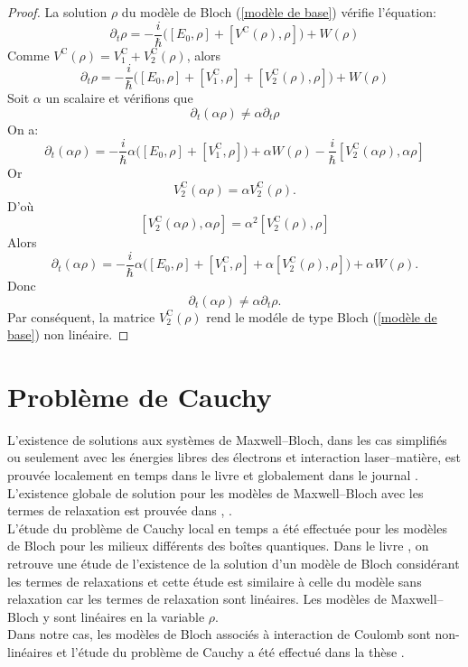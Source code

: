 \documentclass[12pt,a4paper,openany,oneside]{book}
\begin{document}
{{{{{{  \begin{proof}
  La solution $ \rho $ du modèle de Bloch (\ref{modèle de base}) vérifie l'équation:
$$ \partial_{t}\rho  = -\dfrac{i}{\hbar}\Big([E_{0},\rho]+[V^{\textrm{C}}(\rho),\rho]\Big)+ W(\rho) $$
Comme $ V^{\textrm{C}}(\rho)= V_{1}^{\textrm{C}}+ V_{2}^{\textrm{C}}(\rho) $, alors 
$$ \partial_{t}\rho  = -\dfrac{i}{\hbar}\Big([E_{0},\rho]+[V_{1}^{\textrm{C}},\rho]+[V_{2}^{\textrm{C}}(\rho),\rho]\Big)+ W(\rho) $$
Soit $ \alpha $ un scalaire et vérifions que 
$$ \partial_{t}(\alpha\rho) \neq \alpha\partial_{t}\rho $$
On a:
$$ \partial_{t}(\alpha\rho) = -\dfrac{i}{\hbar}\alpha\Big([E_{0},\rho]+[V_{1}^{\textrm{C}},\rho]\Big)+ \alpha W(\rho)-\dfrac{i}{\hbar}[V_{2}^{\textrm{C}}(\alpha\rho),\alpha\rho] $$
Or $$ V_{2}^{\textrm{C}}(\alpha\rho)= \alpha V_{2}^{\textrm{C}}(\rho).$$
D'où
$$ [V_{2}^{\textrm{C}}(\alpha\rho),\alpha\rho] = \alpha^{2}[V_{2}^{\textrm{C}}(\rho),\rho] $$
Alors
$$ \partial_{t}(\alpha\rho) = -\dfrac{i}{\hbar}\alpha\Big([E_{0},\rho]+[V_{1}^{\textrm{C}},\rho] + \alpha[V_{2}^{\textrm{C}}(\rho),\rho]\Big)+ \alpha W(\rho) .$$
Donc 
$$ \partial_{t}(\alpha\rho) \neq \alpha\partial_{t}\rho .$$
Par conséquent, la matrice $ V_{2}^{\textrm{C}}(\rho) $ rend le modéle de type Bloch (\ref{modèle de base}) non linéaire.

  \end{proof}
  
\section{Problème de Cauchy}  

L’existence de solutions aux systèmes de Maxwell–Bloch, dans les cas simplifiés ou seulement avec les énergies libres des électrons et interaction laser–matière, est prouvée localement en temps dans le livre \cite{mareference11} et globalement dans le journal \cite{mareference12}. L’existence globale de solution pour les modèles de Maxwell–Bloch avec les termes de relaxation est prouvée dans \cite{mareference13}, \cite{mareference14}.\\
L’étude du problème de Cauchy local en temps a été effectuée pour les modèles de Bloch pour les milieux différents des boîtes quantiques. Dans le livre \cite{mareference11}, on retrouve une étude de l’existence de la solution d’un modèle de Bloch considérant les termes de relaxations et cette étude est
similaire à celle du modèle sans relaxation car les termes de relaxation sont linéaires. Les
modèles de Maxwell–Bloch y sont linéaires en la variable $\rho $.\\
Dans notre cas, les modèles de Bloch associés à interaction de Coulomb sont non-linéaires et l'étude du problème de Cauchy a été effectué dans la thèse \cite{mareference1}.


}}}}}}
\end{document}
